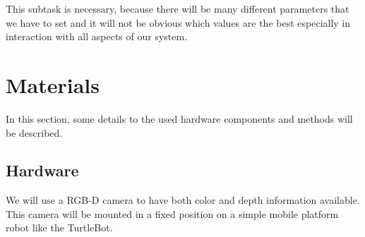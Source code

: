 \documentclass[a4paper,11pt,english]{article}
\begin{document}
This subtask is necessary, because there will be many different parameters that we have to set and it will not be obvious which values are the best especially in interaction with all aspects of our system.

\section{Materials}\label{materials}
In this section, some details to the used hardware components and methods will be described.
\subsection{Hardware}
We will use a RGB-D camera to have both color and depth information available.
This camera will be mounted in a fixed position on a simple mobile platform robot like the TurtleBot.
\end{document}

